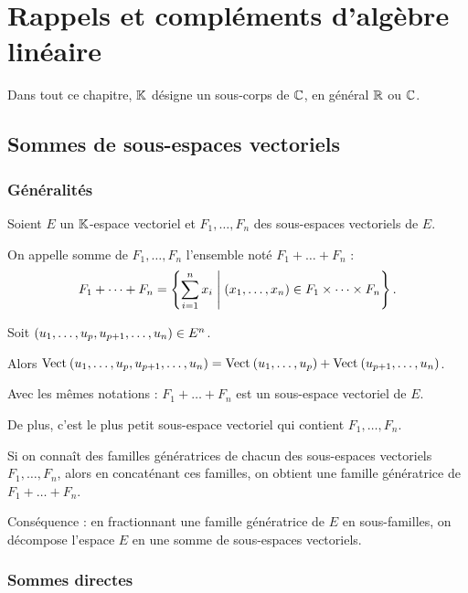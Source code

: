 \chapter{Rappels et compléments d'algèbre linéaire}

\minitoc

Dans tout ce chapitre, \(\mathbb{K}\) désigne un sous-corps de \(\mathbb{C}\), en général \(\mathbb{R}\) ou \(\mathbb{C}\).

\section{Sommes de sous-espaces vectoriels}

\subsection{Généralités}

\begin{defi}
Soient \(E\) un \(\mathbb{K}\)-espace vectoriel et \(F_1,\dots,F_n\) des sous-espaces vectoriels de \(E\).

On appelle somme de \(F_1,\dots,F_n\) l'ensemble noté \(F_1+\dots+F_n\) : \[F_1+\dots+F_n=\left\lbrace\sum_{i=1}^nx_i\;\middle|\;\left(x_1,\dots,x_n\right)\in F_1\times\dots\times F_n\right\rbrace.\]
\end{defi}

\begin{prop}
Soit \(\left(u_1,\dots,u_p,u_{p+1},\dots,u_n\right)\in E^n\).

Alors \(\Vect{u_1,\dots,u_p,u_{p+1},\dots,u_n}=\Vect{u_1,\dots,u_p}+\Vect{u_{p+1},\dots,u_n}\).
\end{prop}

\begin{prop}
Avec les mêmes notations : \(F_1+\dots+F_n\) est un sous-espace vectoriel de \(E\).

De plus, c'est le plus petit sous-espace vectoriel qui contient \(F_1,\dots,F_n\).

Si on connaît des familles génératrices de chacun des sous-espaces vectoriels \(F_1,\dots,F_n\), alors en concaténant ces familles, on obtient une famille génératrice de \(F_1+\dots+F_n\).
\end{prop}

Conséquence : en fractionnant une famille génératrice de \(E\) en sous-familles, on décompose l'espace \(E\) en une somme de sous-espaces vectoriels.

\subsection{Sommes directes}

